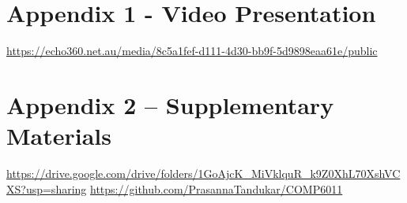 \documentclass[10pt,journal,compsoc]{IEEEtran}
\begin{document}
\appendices
\section*{Appendix 1 - Video Presentation}
\begin{center}
    \url{https://echo360.net.au/media/8c5a1fef-d111-4d30-bb9f-5d9898eaa61e/public}
\end{center}

\section*{Appendix 2 -- Supplementary Materials}

\begin{center}
    \url{https://drive.google.com/drive/folders/1GoAjcK_MiVklquR_k9Z0XhL70XshVCXS?usp=sharing}
    \url{https://github.com/PrasannaTandukar/COMP6011}
\end{center}







\ifCLASSOPTIONcaptionsoff
  \newpage
\fi







\end{document}
